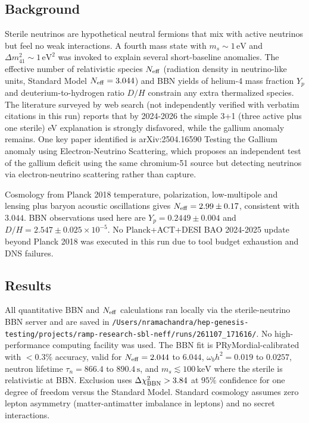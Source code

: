 \documentclass[11pt,a4paper]{article}
\begin{document}
\subsection{Background}
Sterile neutrinos are hypothetical neutral fermions that mix with active neutrinos but feel no weak interactions. A fourth mass state with $m_s \sim 1\,\mathrm{eV}$ and $\Delta m^2_{41} \sim 1\,\mathrm{eV}^2$ was invoked to explain several short-baseline anomalies. The effective number of relativistic species $N_{\rm eff}$ (radiation density in neutrino-like units, Standard Model $N_{\rm eff} = 3.044$) and BBN yields of helium-4 mass fraction $Y_p$ and deuterium-to-hydrogen ratio $D/H$ constrain any extra thermalized species. The literature surveyed by web search (not independently verified with verbatim citations in this run) reports that by 2024-2026 the simple 3+1 (three active plus one sterile) eV explanation is strongly disfavored, while the gallium anomaly remains. One key paper identified is arXiv:2504.16590 Testing the Gallium anomaly using Electron-Neutrino Scattering, which proposes an independent test of the gallium deficit using the same chromium-51 source but detecting neutrinos via electron-neutrino scattering rather than capture.

Cosmology from Planck 2018 temperature, polarization, low-multipole and lensing plus baryon acoustic oscillations gives $N_{\rm eff} = 2.99 \pm 0.17$, consistent with $3.044$. BBN observations used here are $Y_p = 0.2449 \pm 0.004$ and $D/H = 2.547 \pm 0.025 \times 10^{-5}$. No Planck+ACT+DESI BAO 2024-2025 update beyond Planck 2018 was executed in this run due to tool budget exhaustion and DNS failures.

\subsection{Results}
All quantitative BBN and $N_{\rm eff}$ calculations ran locally via the sterile-neutrino BBN server and are saved in \texttt{/\allowbreak{}Users/\allowbreak{}nramachandra/\allowbreak{}hep-genesis-testing/\allowbreak{}projects/\allowbreak{}ramp-research-sbl-neff/\allowbreak{}runs/\allowbreak{}261107\_\allowbreak{}171616/\allowbreak{}}. No high-performance computing facility was used. The BBN fit is PRyMordial-calibrated with $<0.3\%$ accuracy, valid for $N_{\rm eff} = 2.044$ to $6.044$, $\omega_b h^2 = 0.019$ to $0.0257$, neutron lifetime $\tau_n = 866.4$ to $890.4\,\mathrm{s}$, and $m_s \lesssim 100\,\mathrm{keV}$ where the sterile is relativistic at BBN. Exclusion uses $\Delta\chi^2_{\rm BBN} > 3.84$ at $95\%$ confidence for one degree of freedom versus the Standard Model. Standard cosmology assumes zero lepton asymmetry (matter-antimatter imbalance in leptons) and no secret interactions.
\end{document}
